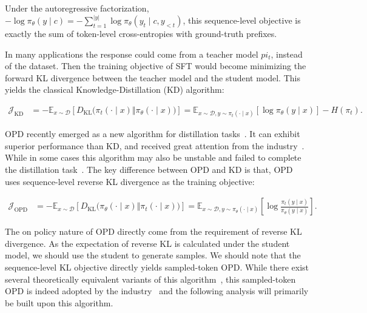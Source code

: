 Under the autoregressive factorization,
$-\log\pi_\theta(y\mid c)=-\sum_{t=1}^{|y|}
\log\pi_\theta(y_t\mid c,y_{<t})$, this sequence-level objective is exactly the sum of token-level
cross-entropies with ground-truth prefixes.

In many applications the response could come from a teacher model $pi_t$, instead of the dataset. Then the training objective of SFT would become minimizing the forward KL divergence between the teacher model and the student model. This yields the classical Knowledge-Distillation (KD) algorithm:

\begin{align}
  \mathcal{J}_{\mathrm{KD}} &= -\mathbb{E}_{x\sim\mathcal{D}} [D_{\mathrm{KL}}\bigl(\pi_t (\cdot\mid x)\Vert \pi_\theta (\cdot\mid x)\bigr)] = \mathbb{E}_{x\sim\mathcal{D}, y\sim\pi_t (\cdot\mid x)} [\log \pi_\theta (y\mid x)] - H(\pi_t).
  \label{eq:kl-loss}
\end{align}

OPD recently emerged as a new algorithm for distillation tasks~\citep{thinking_machines_lab_-policy_2025}. It can exhibit superior performance than KD, and received great attention from the industry~\citep{team_kimi_2026, deepseek-ai_deepseek-v4_2026, glm-5-team_glm-5_2026}. While in some cases this algorithm may also be unstable and failed to complete the distillation task~\citep{li_rethinking_2026}. The key difference between OPD and KD is that, OPD uses sequence-level reverse KL divergence as the training objective:

\begin{align}
  \mathcal{J}_{\mathrm{OPD}} &= -\mathbb{E}_{x\sim\mathcal{D}} [D_{\mathrm{KL}}\bigl(\pi_\theta (\cdot\mid x)\Vert \pi_t (\cdot\mid x)\bigr)]
  = \mathbb{E}_{x\sim\mathcal{D}, y\sim\pi_\theta (\cdot\mid x)} [\log \frac{\pi_t (y\mid x)}{\pi_\theta (y\mid x)}].
  \label{eq:opd-loss}
\end{align}

The on policy nature of OPD directly come from the requirement of reverse KL divergence. As the expectation of reverse KL is calculated under the student model, we should use the student to generate samples. We should note that the sequence-level KL objective directly yields sampled-token OPD. While there exist several theoretically equivalent variants of this algorithm~\citep{li_rethinking_2026}, this sampled-token OPD is indeed adopted by the industry~\citep{team_kimi_2026} and the following analysis will primarily be built upon this algorithm.

